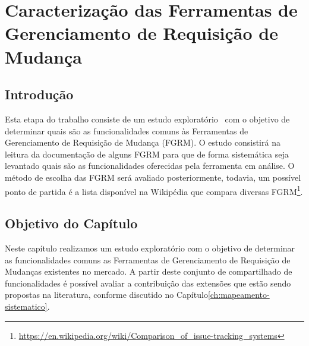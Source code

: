 \chapter{Caracterização das Ferramentas de Gerenciamento de Requisição de
	Mudança}
\label{ch:caracterizacao}


\section{Introdução}


Esta etapa do trabalho consiste de um estudo
exploratório~\cite{wohlin2012experimentation} com o objetivo de determinar quais
são as funcionalidades comuns às Ferramentas de Gerenciamento de Requisição de
Mudança (FGRM). O estudo consistirá na leitura da documentação de alguns FGRM
para que de forma sistemática seja levantado quais são as funcionalidades
oferecidas pela ferramenta em análise. O método de escolha das FGRM será
avaliado posteriormente, todavia, um possível ponto de partida é a lista
disponível na Wikipédia que compara diversas
FGRM\footnote{
	\url{https://en.wikipedia.org/wiki/Comparison_of_issue-tracking_systems}}.
\section{Objetivo do Capítulo}
\label{sec:objetivo_do_capítulo}

Neste capítulo realizamos um estudo exploratório com o objetivo de determinar as
funcionalidades comuns as Ferramentas de Gerenciamento de Requisição de Mudanças
existentes no mercado. A partir deste conjunto de compartilhado de
funcionalidades é possível avaliar a contribuição das extensões que estão sendo
propostas na literatura, conforme discutido no
Capítulo\ref{ch:mapeamento-sistematico}.

